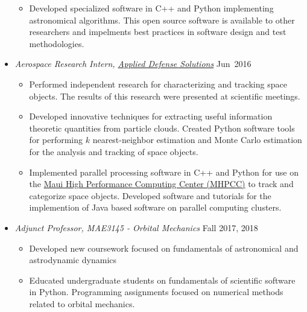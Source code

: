 \begin{itemize}
\begin{itemize}
        \item Developed specialized software in C++ and Python implementing astronomical algorithms.
            This open source software is available to other researchers and impelments best practices in software design and test methodologies.
        \end{itemize}
        \item[] \textit{Aerospace Research Intern, \href{http://www.applieddefense.com/}{Applied Defense Solutions}} \hfill {Jun~2016}
        \begin{itemize}
            \item Performed independent research for characterizing and tracking space objects. The results of this research were presented at scientific meetings.
            \item Developed innovative techniques for extracting useful information theoretic quantities from particle clouds. 
            Created Python software tools for performing \(k\) nearest-neighbor estimation and Monte Carlo estimation for the analysis and tracking of space objects.
            \item Implemented parallel processing software in C++ and Python for use on the \href{https://www.mhpcc.hpc.mil/}{Maui High Performance Computing Center (MHPCC)} to track and categorize space objects.
            Developed software and tutorials for the implemention of Java based software on parallel computing clusters.
        \end{itemize}
        \item[] \textit{Adjunct Professor, MAE3145 - Orbital Mechanics} \hfill {Fall 2017, 2018}
            \begin{itemize}
                \item Developed new coursework focused on fundamentals of astronomical and astrodynamic dynamics
                \item Educated undergraduate students on fundamentals of scientific software in Python. 
                    Programming assignments focused on numerical methods related to orbital mechanics.
                    


\end{itemize}
\end{itemize}
